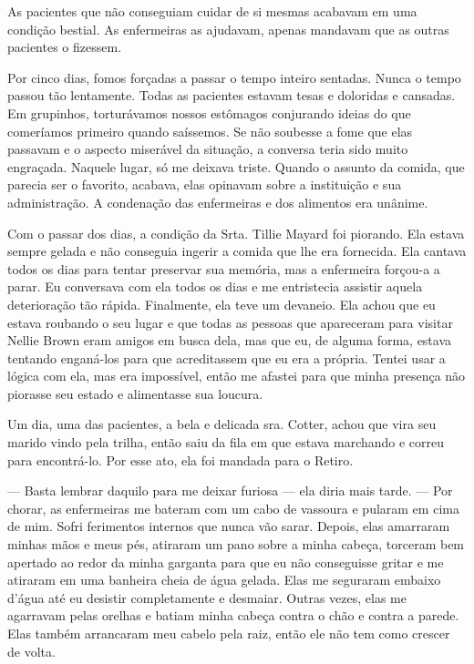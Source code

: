 As pacientes que não conseguiam cuidar de si mesmas acabavam em uma
condição bestial. As enfermeiras as ajudavam, apenas mandavam que as
outras pacientes o fizessem.

Por cinco dias, fomos forçadas a passar o tempo inteiro sentadas. Nunca
o tempo passou tão lentamente. Todas as pacientes estavam tesas e
doloridas e cansadas. Em grupinhos, torturávamos nossos estômagos
conjurando ideias do que comeríamos primeiro quando saíssemos. Se não
soubesse a fome que elas passavam e o aspecto miserável da situação, a
conversa teria sido muito engraçada. Naquele lugar, só me deixava
triste. Quando o assunto da comida, que parecia ser o favorito, acabava,
elas opinavam sobre a instituição e sua administração. A condenação das
enfermeiras e dos alimentos era unânime.

Com o passar dos dias, a condição da Srta. Tillie Mayard foi piorando.
Ela estava sempre gelada e não conseguia ingerir a comida que lhe era
fornecida. Ela cantava todos os dias para tentar preservar sua memória,
mas a enfermeira forçou-a a parar. Eu conversava com ela todos os dias e
me entristecia assistir aquela deterioração tão rápida. Finalmente, ela
teve um devaneio. Ela achou que eu estava roubando o seu lugar e que
todas as pessoas que apareceram para visitar Nellie Brown eram amigos em
busca dela, mas que eu, de alguma forma, estava tentando enganá-los para
que acreditassem que eu era a própria. Tentei usar a lógica com ela, mas
era impossível, então me afastei para que minha presença não piorasse
seu estado e alimentasse sua loucura.

Um dia, uma das pacientes, a bela e delicada sra. Cotter, achou que vira
seu marido vindo pela trilha, então saiu da fila em que estava marchando
e correu para encontrá-lo. Por esse ato, ela foi mandada para o Retiro.

--- Basta lembrar daquilo para me deixar furiosa --- ela diria mais
tarde. --- Por chorar, as enfermeiras me bateram com um cabo de vassoura
e pularam em cima de mim. Sofri ferimentos internos que nunca vão sarar.
Depois, elas amarraram minhas mãos e meus pés, atiraram um pano sobre a
minha cabeça, torceram bem apertado ao redor da minha garganta para que
eu não conseguisse gritar e me atiraram em uma banheira cheia de água
gelada. Elas me seguraram embaixo d'água até eu desistir completamente e
desmaiar. Outras vezes, elas me agarravam pelas orelhas e batiam minha
cabeça contra o chão e contra a parede. Elas também arrancaram meu
cabelo pela raiz, então ele não tem como crescer de volta.

